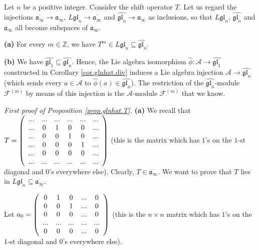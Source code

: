 \documentclass[etingof-lie.tex]{subfiles}
\begin{document}
\begin{proposition}
\label{prop.glnhat.T}Let $n$ be a positive integer. Consider the shift
operator $T$. Let us regard the injections $\overline{\mathfrak{a}_{\infty}%
}\rightarrow\mathfrak{a}_{\infty}$, $L\mathfrak{gl}_{n}\rightarrow
\overline{\mathfrak{a}_{\infty}}$ and $\widehat{\mathfrak{gl}_{n}}%
\rightarrow\mathfrak{a}_{\infty}$ as inclusions, so that $L\mathfrak{gl}_{n}$,
$\widehat{\mathfrak{gl}_{n}}$ and $\mathfrak{a}_{\infty}$ all become subspaces
of $\mathfrak{a}_{\infty}$.

\textbf{(a)} For every $m\in\mathbb{Z}$, we have $T^{m}\in L\mathfrak{gl}%
_{n}\subseteq\widehat{\mathfrak{gl}_{n}}$.

\textbf{(b)} We have $\widehat{\mathfrak{gl}_{1}}\subseteq
\widehat{\mathfrak{gl}_{n}}$. Hence, the Lie algebra isomorphism
$\widehat{\phi}:\mathcal{A}\rightarrow\widehat{\mathfrak{gl}_{1}}$ constructed
in Corollary \ref{cor.glnhat.div} induces a Lie algebra injection
$\mathcal{A}\rightarrow\widehat{\mathfrak{gl}_{n}}$ (which sends every
$a\in\mathcal{A}$ to $\widehat{\phi}\left(  a\right)  \in
\widehat{\mathfrak{gl}_{n}}$). The restriction of the $\widehat{\mathfrak{gl}%
_{n}}$-module $\mathcal{F}^{\left(  m\right)  }$ by means of this injection is
the $\mathcal{A}$-module $\mathcal{F}^{\left(  m\right)  }$ that we know.
\end{proposition}

\textit{First proof of Proposition \ref{prop.glnhat.T}.} \textbf{(a)} We
recall that $T=\left(
\begin{array}
[c]{cccccc}%
... & ... & ... & ... & ... & ...\\
... & 0 & 1 & 0 & 0 & ...\\
... & 0 & 0 & 1 & 0 & ...\\
... & 0 & 0 & 0 & 1 & ...\\
... & 0 & 0 & 0 & 0 & ...\\
... & ... & ... & ... & ... & ...
\end{array}
\right)  $ (this is the matrix which has $1$'s on the $1$-st diagonal and
$0$'s everywhere else). Clearly, $T\in\overline{\mathfrak{a}_{\infty}}$. We
want to prove that $T$ lies in $L\mathfrak{gl}_{n}\subseteq\overline
{\mathfrak{a}_{\infty}}$.

Let $a_{0}=\left(
\begin{array}
[c]{ccccc}%
0 & 1 & 0 & ... & 0\\
0 & 0 & 1 & ... & 0\\
0 & 0 & 0 & ... & 0\\
... & ... & ... & ... & ...\\
0 & 0 & 0 & ... & 0
\end{array}
\right)  $ (this is the $n\times n$ matrix which has $1$'s on the $1$-st
diagonal and $0$'s everywhere else).
\end{document}
